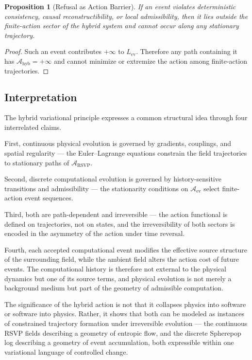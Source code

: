 \documentclass[12pt, twoside]{article}
\theoremstyle{plain}
\newtheorem{proposition}[theorem]{Proposition}
\theoremstyle{definition}
\theoremstyle{remark}
\begin{document}
\begin{proposition}[Refusal as Action Barrier]
\label{prop:refusal}
If an event violates deterministic consistency,
causal reconstructibility, or local admissibility,
then it lies outside the finite-action sector of the hybrid system
and cannot occur along any stationary trajectory.
\end{proposition}

\begin{proof}
Such an event contributes $+\infty$ to $L_{\mathrm{ev}}$.
Therefore any path containing it has
$\mathcal{A}_{\mathrm{hyb}} = +\infty$
and cannot minimize or extremize the action
among finite-action trajectories.
\end{proof}

\subsection{Interpretation}

The hybrid variational principle expresses a common structural idea
through four interrelated claims.

First, continuous physical evolution is governed by gradients,
couplings, and spatial regularity — the Euler--Lagrange equations
constrain the field trajectories to stationary paths of $\mathcal{A}_{\mathrm{RSVP}}$.

Second, discrete computational evolution is governed by
history-sensitive transitions and admissibility — the stationarity
conditions on $\mathcal{A}_{\mathrm{ev}}$ select finite-action event sequences.

Third, both are path-dependent and irreversible — the action
functional is defined on trajectories, not on states,
and the irreversibility of both sectors is encoded in the
asymmetry of the action under time reversal.

Fourth, each accepted computational event modifies the effective
source structure of the surrounding field, while the ambient field
alters the action cost of future events.
The computational history is therefore not external to the physical
dynamics but one of its source terms, and physical evolution
is not merely a background medium but part of the geometry
of admissible computation.

The significance of the hybrid action is not that it collapses
physics into software or software into physics.
Rather, it shows that both can be modeled as instances of
constrained trajectory formation under irreversible evolution —
the continuous RSVP fields describing a geometry of entropic flow,
and the discrete Spherepop log describing a geometry of event
accumulation, both expressible within one variational language
of controlled change.
\end{document}
